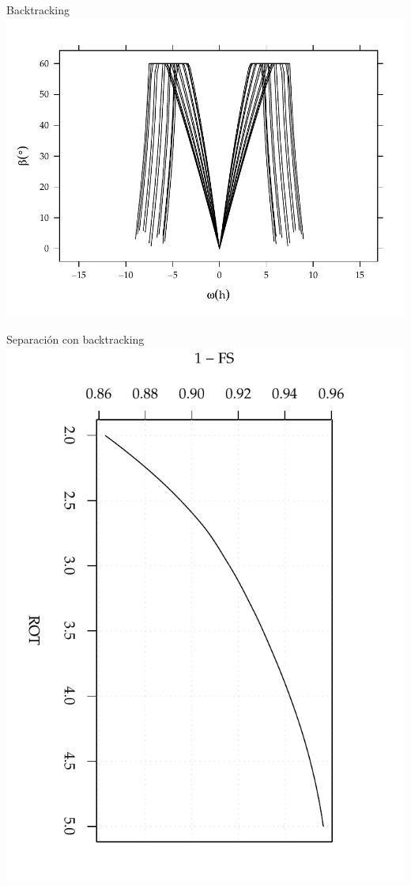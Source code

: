 \documentclass[xcolor={usenames,svgnames,dvipsnames}]{beamer}
\begin{document}
\begin{frame}[label=sec-2-4-4]{Backtracking}
\includegraphics[width=.9\linewidth]{../figs/BackTracking.pdf}
\end{frame}

\begin{frame}[label=sec-2-4-5]{Separación con backtracking}
\includegraphics[angle=90,width=.9\linewidth]{../figs/AbacoHorizBT_Ene10.pdf}
\end{frame}
\end{document}
